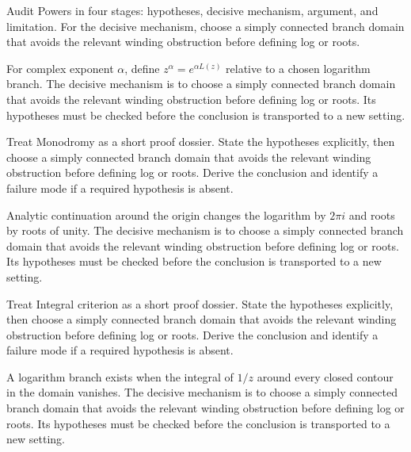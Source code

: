 \begin{problem}\label{prob:iv14-problem-06}
Audit Powers in four stages: hypotheses, decisive mechanism, argument, and limitation. For the decisive mechanism, choose a simply connected branch domain that avoids the relevant winding obstruction before defining log or roots.
\end{problem}
\begin{solution}
For complex exponent $\alpha$, define $z^\alpha=e^{\alpha L(z)}$ relative to a chosen logarithm branch. The decisive mechanism is to choose a simply connected branch domain that avoids the relevant winding obstruction before defining log or roots. Its hypotheses must be checked before the conclusion is transported to a new setting.
\end{solution}

\begin{problem}\label{prob:iv14-problem-07}
Treat Monodromy as a short proof dossier. State the hypotheses explicitly, then choose a simply connected branch domain that avoids the relevant winding obstruction before defining log or roots. Derive the conclusion and identify a failure mode if a required hypothesis is absent.
\end{problem}
\begin{solution}
Analytic continuation around the origin changes the logarithm by $2\pi i$ and roots by roots of unity. The decisive mechanism is to choose a simply connected branch domain that avoids the relevant winding obstruction before defining log or roots. Its hypotheses must be checked before the conclusion is transported to a new setting.
\end{solution}

\begin{problem}\label{prob:iv14-problem-08}
Treat Integral criterion as a short proof dossier. State the hypotheses explicitly, then choose a simply connected branch domain that avoids the relevant winding obstruction before defining log or roots. Derive the conclusion and identify a failure mode if a required hypothesis is absent.
\end{problem}
\begin{solution}
A logarithm branch exists when the integral of $1/z$ around every closed contour in the domain vanishes. The decisive mechanism is to choose a simply connected branch domain that avoids the relevant winding obstruction before defining log or roots. Its hypotheses must be checked before the conclusion is transported to a new setting.
\end{solution}

